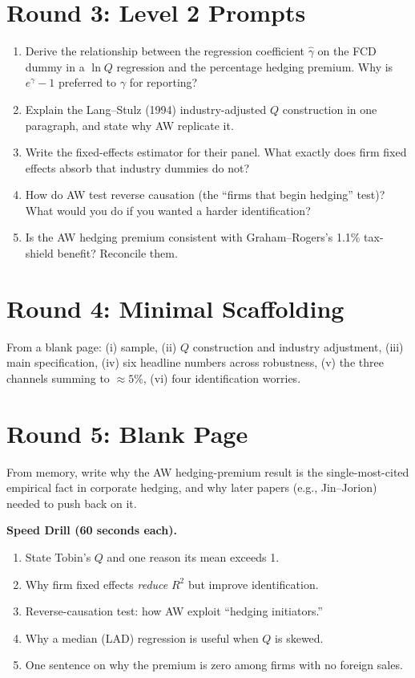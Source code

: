 \documentclass[11pt]{article}
\begin{document}
\section*{Round 3: Level 2 Prompts}
\begin{enumerate}
\item Derive the relationship between the regression coefficient $\hat\gamma$ on the FCD dummy in a $\ln Q$ regression and the percentage hedging premium. Why is $e^\gamma-1$ preferred to $\gamma$ for reporting?
\item Explain the Lang--Stulz (1994) industry-adjusted $Q$ construction in one paragraph, and state why AW replicate it.
\item Write the fixed-effects estimator for their panel. What exactly does firm fixed effects absorb that industry dummies do not?
\item How do AW test reverse causation (the ``firms that begin hedging'' test)? What would you do if you wanted a harder identification?
\item Is the AW hedging premium consistent with Graham--Rogers's 1.1\% tax-shield benefit? Reconcile them.
\end{enumerate}

\section*{Round 4: Minimal Scaffolding}
From a blank page: (i) sample, (ii) $Q$ construction and industry adjustment, (iii) main specification, (iv) six headline numbers across robustness, (v) the three channels summing to $\approx 5\%$, (vi) four identification worries.

\section*{Round 5: Blank Page}
From memory, write why the AW hedging-premium result is the single-most-cited empirical fact in corporate hedging, and why later papers (e.g., Jin--Jorion) needed to push back on it.

\vspace{6pt}
\begin{drillbox}
\textbf{Speed Drill (60 seconds each).}
\begin{enumerate}
\item State Tobin's $Q$ and one reason its mean exceeds 1.
\item Why firm fixed effects \emph{reduce} $R^2$ but improve identification.
\item Reverse-causation test: how AW exploit ``hedging initiators.''
\item Why a median (LAD) regression is useful when $Q$ is skewed.
\item One sentence on why the premium is zero among firms with no foreign sales.
\end{enumerate}
\end{drillbox}
\end{document}
